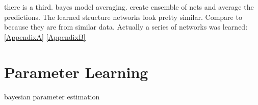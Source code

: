 there is a third. bayes model averaging. create ensemble of nets and average the predictions.
The learned structure networks look pretty similar. Compare to \citep{Vogel2014} because they are from similar data. Actually a series of networks was learned: \ref{AppendixA} \ref{AppendixB}


\section{Parameter Learning}

bayesian parameter estimation

